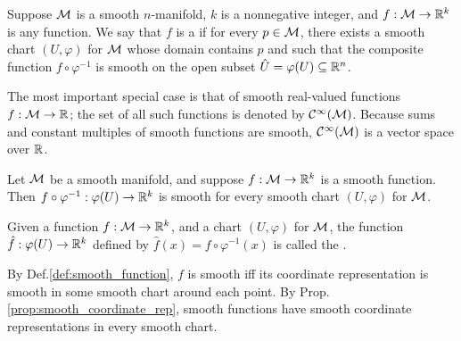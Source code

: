 \documentclass[11pt,a4paper]{article}
\begin{document}
\begin{definition}\label{def:smooth_function}
Suppose $\mathcal{M}$ is a smooth $n$-manifold, $k$ is a nonnegative integer, and $f:\mathcal{M}\rightarrow \mathbb{R}^k$ is any function. We say that $f$ is a  if for every $p\in\mathcal{M}$, there exists a smooth chart $(U,\varphi)$ for $\mathcal{M}$ whose domain contains $p$ and such that the composite function $f\circ\varphi^{-1}$ is smooth on the open subset $\hat{U} = \varphi(U)\subseteq\mathbb{R}^n$.
\end{definition}

\begin{note}
The most important special case is that of smooth real-valued functions $f:\mathcal{M}\rightarrow \mathbb{R}$; the set of all such functions is denoted by $\mathcal{C}^\infty(\mathcal{M})$. Because sums and constant multiples of smooth functions are smooth, $\mathcal{C}^\infty(\mathcal{M})$ is a vector space over $\mathbb{R}$.
\end{note}

\begin{prop}\label{prop:smooth_coordinate_rep}
Let $\mathcal{M}$ be a smooth manifold, and suppose $f:\mathcal{M}\rightarrow \mathbb{R}^k$ is a smooth function. Then $f\circ\varphi^{-1}:\varphi(U)\rightarrow \mathbb{R}^k$ is smooth for every smooth chart $(U,\varphi)$ for $\mathcal{M}$.
\end{prop}


\begin{definition}
Given a function $f:\mathcal{M}\rightarrow \mathbb{R}^k$, and a chart $(U,\varphi)$ for $\mathcal{M}$, the function $\hat{f}:\varphi(U)\rightarrow \mathbb{R}^k$ defined by $\hat{f}(x) = f\circ\varphi^{-1}(x)$ is called the .
\end{definition}

\begin{remark}
By Def.\ref{def:smooth_function}, $f$ is smooth iff its coordinate representation is smooth in some smooth chart around each point. By Prop.\ref{prop:smooth_coordinate_rep}, smooth functions have smooth coordinate representations in every smooth chart.
\end{remark}
\end{document}
